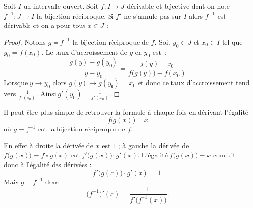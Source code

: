 \documentclass[class=report,crop=false]{standalone}
\begin{document}
\begin{corollaire}
Soit $I$ un intervalle ouvert. Soit $f : I \to J$ dérivable et bijective dont on note
$f^{-1} : J \to I$ la bijection réciproque. Si $f'$ ne s'annule pas sur $I$ alors $f^{-1}$ est dérivable
et on a pour tout $x \in J$ :
\end{corollaire}


\begin{proof}
Notons $g=f^{-1}$ la bijection réciproque de $f$.
Soit $y_0 \in J$ et $x_0\in I$ tel que $y_0=f(x_0)$. Le taux d'accroissement de $g$ en $y_0$ est~:
$$\frac{g(y)-g(y_0)}{y-y_0}=\frac{g(y)-x_0}{f\big(g(y)\big) - f(x_0)}$$
Lorsque $y\to y_0$ alors $g(y)\to g(y_0) = x_0$ et donc ce taux d'accroissement tend vers $\frac{1}{f'(x_0)}$.
Ainsi $g'(y_0)=\frac{1}{f'(x_0)}$.
\end{proof}

\begin{remarque*}
Il peut être plus simple de retrouver la formule à chaque fois
en dérivant l'égalité
$$f\big( g(x) \big)  = x$$
où $g=f^{-1}$ est la bijection réciproque de $f$.

En effet à droite la dérivée de $x$ est $1$ ;
à gauche la dérivée de $f\big( g(x) \big) = f \circ g(x)$ est $f'\big(g(x)\big) \cdot g'(x)$.
L'égalité $f\big( g(x) \big)  = x$ conduit donc à l'égalité des dérivées :
$$f'\big(g(x)\big)\cdot g'(x) = 1.$$
Mais $g=f^{-1}$ donc
$$\big(f^{-1}\big)'(x)= \frac{1}{f'\big( f^{-1}(x) \big)}.$$
\end{remarque*}
\end{document}
